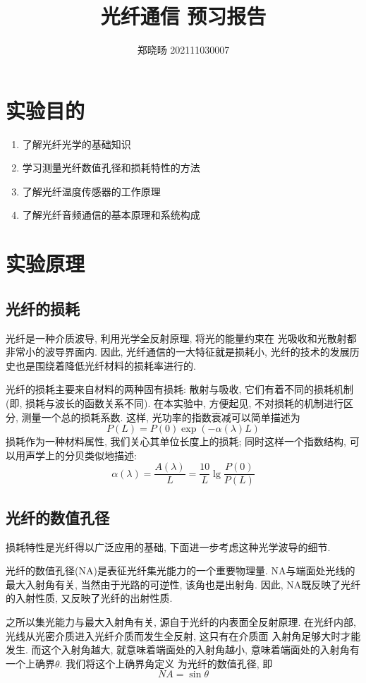 \documentclass[12pt,a4paper]{article}
\title{\vspace{-4cm}\Large 光纤通信 预习报告}  %
\author{\kaishu 郑晓旸 202111030007}   %
\date{}
\begin{document}
\maketitle
\section{实验目的}
\begin{enumerate}
\item 了解光纤光学的基础知识
\item 学习测量光纤数值孔径和损耗特性的方法
\item 了解光纤温度传感器的工作原理
\item 了解光纤音频通信的基本原理和系统构成
\end{enumerate}
\section{实验原理}
\subsection{光纤的损耗}
光纤是一种介质波导, 利用光学全反射原理, 将光的能量约束在
光吸收和光散射都非常小的波导界面内. 因此, 光纤通信的一大特征就是损耗小, 
光纤的技术的发展历史也是围绕着降低光纤材料的损耗率进行的. 

光纤的损耗主要来自材料的两种固有损耗: 散射与吸收, 它们有着不同的损耗机制(即, 损耗与波长的函数关系不同).
在本实验中, 方便起见, 不对损耗的机制进行区分, 测量一个总的损耗系数. 这样, 光功率的指数衰减可以简单描述为
$$P(L)=P(0)\exp{(-\alpha(\lambda)L)}$$
损耗作为一种材料属性, 我们关心其单位长度上的损耗; 同时这样一个指数结构, 可以用声学上的分贝类似地描述:
\begin{equation}
\alpha(\lambda)=\frac{A(\lambda)}{L}=\frac{10}{L}\lg{\frac{P(0)}{P(L)}}
\end{equation}

\subsection{光纤的数值孔径}
损耗特性是光纤得以广泛应用的基础, 下面进一步考虑这种光学波导的细节. 

光纤的数值孔径(NA)是表征光纤集光能力的一个重要物理量. NA与端面处光线的最大入射角有关, 当然由于光路的可逆性, 
该角也是出射角. 因此, NA既反映了光纤的入射性质, 又反映了光纤的出射性质. 

之所以集光能力与最大入射角有关, 源自于光纤的内表面全反射原理. 在光纤内部, 光线从光密介质进入光纤介质而发生全反射, 这只有在介质面
入射角足够大时才能发生. 而这个入射角越大, 就意味着端面处的入射角越小, 意味着端面处的入射角有一个上确界$\theta$. 我们将这个上确界角定义
为光纤的数值孔径, 即
\begin{equation}
    NA=\sin{\theta}
\end{equation}
\end{document}
